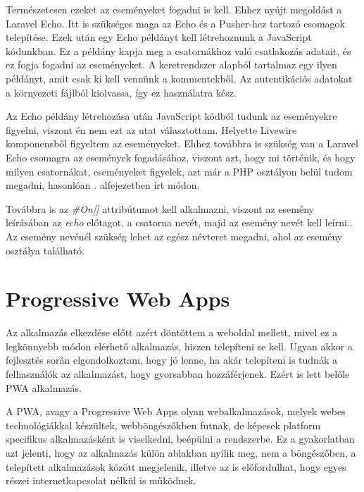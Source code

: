 \documentclass[
]{thesis-ekf}
\theoremstyle{definition}
\theoremstyle{remark}
\begin{document}
Természetesen ezeket az eseményeket fogadni is kell. Ehhez nyújt megoldást a Laravel Echo\cite{broadcasting}. Itt is szükséges maga az Echo és a Pusher-hez tartozó csomagok telepítése. Ezek után egy Echo példányt kell létrehoznunk a JavaScript kódunkban. Ez a példány kapja meg a csatornákhoz való csatlakozás adatait, és ez fogja fogadni az eseményeket. A keretrendszer alapból tartalmaz egy ilyen példányt, amit csak ki kell vennünk a  kommentekből. Az autentikációs adatokat a környezeti fájlból kiolvassa, így ez használatra kész.

Az Echo példány létrehozása után JavaScript kódból tudunk az eseményekre figyelni, viszont én nem ezt az utat választottam. Helyette Livewire komponensből figyeltem az eseményeket. Ehhez továbbra is szükség van a Laravel Echo csomagra az események fogadásához, viszont azt, hogy mi történik, és hogy milyen csatornákat, eseményeket figyelek, azt már a PHP osztályon belül tudom megadni, hasonlóan . alfejezetben írt módon.

Továbbra is az \emph{\#On[]} attribútumot kell alkalmazni, viszont az esemény leírásában az \emph{echo} előtagot, a csatorna nevét, majd az esemény nevét kell leírni.\cite{livewireEcho}. Az esemény nevénél szükség lehet az egész névteret megadni, ahol az esemény osztálya található.



\section{Progressive Web Apps}

Az alkalmazás elkezdése előtt azért döntöttem a weboldal mellett, mivel ez a legkönnyebb módon elérhető alkalmazás, hiszen telepíteni se kell. Ugyan akkor a fejlesztés során elgondolkoztam, hogy jó lenne, ha akár telepíteni is tudnák a felhasználók az alkalmazást, hogy gyorsabban hozzáférjenek. Ezért is lett belőle PWA alkalmazás.

A PWA, avagy a Progressive Web Apps olyan webalkalmazások, melyek webes technológiákkal készültek, webböngészőkben futnak, de képesek platform specifikus alkalmazásként is viselkedni, beépülni a rendszerbe.\cite{PWA} Ez a gyakorlatban azt jelenti, hogy az alkalmazás külön ablakban nyílik meg, nem a böngészőben, a telepített alkalmazások között megjelenik, illetve az is előfordulhat, hogy egyes részei internetkapcsolat nélkül is működnek.
\end{document}
